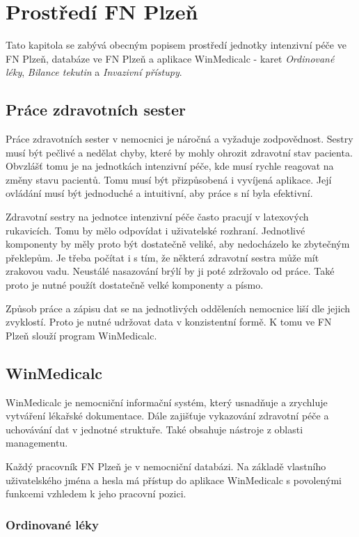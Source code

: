 \chapter{Prostředí FN Plzeň}

Tato kapitola se zabývá obecným popisem prostředí jednotky intenzivní péče ve FN Plzeň, databáze ve FN Plzeň a aplikace WinMedicalc - karet \emph{Ordinované léky}, \emph{Bilance tekutin} a \emph{Invazivní přístupy}.

\section{Práce zdravotních sester}

Práce zdravotních sester v nemocnici je náročná a vyžaduje zodpovědnost. Sestry musí být pečlivé a nedělat chyby, které by mohly ohrozit zdravotní stav pacienta. Obvzlášť tomu je na jednotkách intenzivní péče, kde musí rychle reagovat na změny stavu pacientů. Tomu musí být přizpůsobená i vyvíjená aplikace. Její ovládání musí být jednoduché a intuitivní, aby práce s ní byla efektivní.

Zdravotní sestry na jednotce intenzivní péče často pracují v latexových rukavicích. Tomu by mělo odpovídat i uživatelské rozhraní. Jednotlivé komponenty by měly proto být dostatečně veliké, aby nedocházelo ke zbytečným překlepům. Je třeba počítat i s tím, že některá zdravotní sestra může mít zrakovou vadu. Neustálé nasazování brýlí by ji poté zdržovalo od práce. Také proto je nutné použít dostatečně velké komponenty a písmo.

Způsob práce a zápisu dat se na jednotlivých odděleních nemocnice liší dle jejich zvyklostí. Proto je nutné udržovat data v konzistentní formě. K tomu ve FN Plzeň slouží program WinMedicalc.

\section{WinMedicalc}

WinMedicalc je nemocniční informační systém, který usnadňuje a zrychluje vytváření lékařské dokumentace. Dále zajišťuje vykazování zdravotní péče a uchovávání dat v jednotné struktuře. Také obsahuje nástroje z oblasti managementu.

Každý pracovník FN Plzeň je v nemocniční databázi. Na základě vlastního uživatelského jména a hesla má přístup do aplikace WinMedicalc s povolenými funkcemi vzhledem k jeho pracovní pozici.

\subsection{Ordinované léky}


